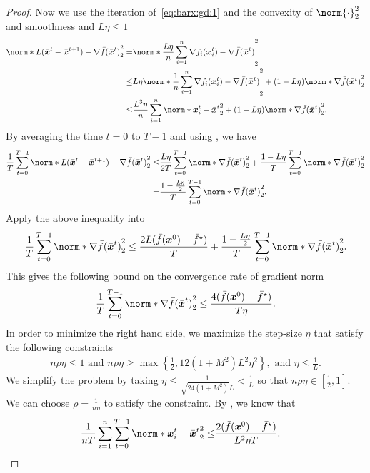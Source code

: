 \documentclass{article}
\begin{document}
\begin{proof}
  Now we use the iteration of~\eqref{eq:barx:gd:1} and the convexity of $\norm{\cdot}_2^2$ and smoothness  and $L\eta\le1$
  \begin{align*}
    \norm*{L(\bar{\xx}^{t}-\bar{\xx}^{t+1}) - \nabla \bar{f}(\bar{\xx}^{t})}_2^2
    =& \norm*{\frac{L \eta}{n} \sum_{i=1}^n \nabla f_i(\xx_i^t) - \nabla \bar{f}(\bar{\xx}^{t})}_2^2 \\
    \le& L\eta\norm*{\frac{1}{n}\sum_{i=1}^n \nabla f_i(\xx_i^t) - \nabla \bar{f}(\bar{\xx}^{t})}_2^2 + (1-L\eta) \norm*{\nabla \bar{f} (\bar{\xx}^{t})}_2^2 \\
    \le& \frac{L^3\eta}{n}\sum_{i=1}^n\norm*{\xx_i^t - \bar{\xx}^{t}}_2^2 + (1-L\eta) \norm*{\nabla \bar{f} (\bar{\xx}^{t})}_2^2.
  \end{align*}
  By averaging the time $t=0$ to $T-1$ and using , we have
  \begin{align*}
    \frac{1}{T}\sum_{t=0}^{T-1}\norm*{L(\bar{\xx}^{t}-\bar{\xx}^{t+1}) - \nabla \bar{f}(\bar{\xx}^{t})}_2^2
    \le&
    \frac{L\eta}{2 T} \sum_{t=0}^{T-1} \norm*{\nabla \bar{f}(\bar{\xx}^t) }_2^2 
    + \frac{1-L\eta}{T}\sum_{t=0}^{T-1} \norm*{\nabla \bar{f} (\bar{\xx}^{t})}_2^2 \\
    =&
    \frac{1-\frac{L\eta}{2}}{T}\sum_{t=0}^{T-1} \norm*{\nabla \bar{f} (\bar{\xx}^{t})}_2^2.
  \end{align*}
  Apply the above inequality into 
  \begin{align*}
    \frac{1}{T} \sum_{t=0}^{T-1} \norm*{\nabla \bar{f}(\bar{\xx}^{t})}_2^2
    \le \frac{2L(\bar{f}(\xx^{0}) - \bar{f}^\star)}{T}
    + \frac{1-\frac{L\eta}{2}}{T}\sum_{t=0}^{T-1} \norm*{\nabla \bar{f} (\bar{\xx}^{t})}_2^2.
  \end{align*}
  This gives the following bound on the convergence rate of gradient norm
  \begin{align*}
    \frac{1}{T} \sum_{t=0}^{T-1} \norm*{\nabla \bar{f}(\bar{\xx}^{t})}_2^2
    \le \frac{4(\bar{f}(\xx^{0}) - \bar{f}^\star)}{T\eta}.
  \end{align*}
  In order to minimize the right hand side, we maximize the step-size $\eta$  that satisfy the following constraints
  \begin{align*}
    n\rho\eta\le 1 \text{ and } n\rho\eta\ge\max\left\{\frac{1}{2}, 12(1+M^2)L^2\eta^2\right\}, 
    \text{ and } \eta\le \frac{1}{L}.
  \end{align*}
  We simplify the problem by taking $\eta\le \frac{1}{\sqrt{24(1+M^2)}L}<\frac{1}{L}$ so that $n\rho\eta\in[\frac{1}{2}, 1]$. We can choose $\rho=\frac{1}{n\eta}$ to satisfy the constraint. By , we know that
  \begin{align*}
    \frac{1}{nT}\sum_{i=1}^n\sum_{t=0}^{T-1} \norm*{\xx_i^{t} - \bar{\xx}^{t}}_2^2
    \le& \frac{2(\bar{f}(\xx^{0}) - \bar{f}^\star)}{L^2\eta T}.
  \end{align*}
\end{proof}
\end{document}
